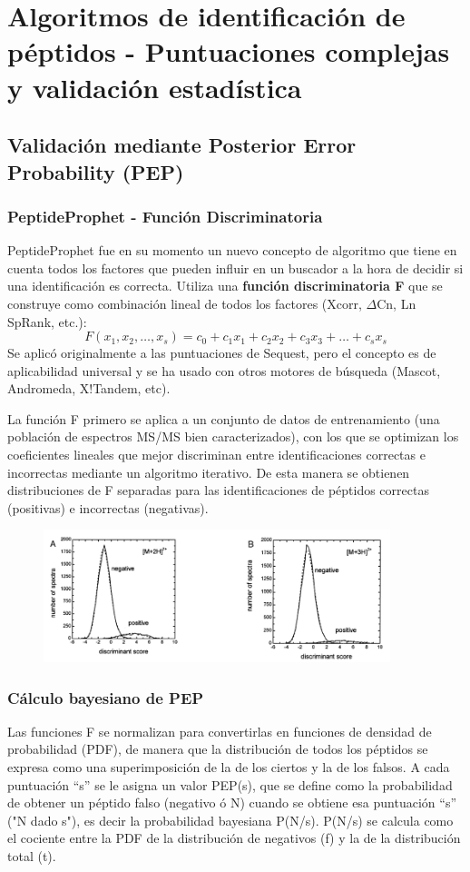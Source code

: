 \section{Algoritmos de identificación de péptidos - Puntuaciones complejas y validación estadística}
\subsection{Validación mediante Posterior Error Probability (PEP)}
\subsubsection{PeptideProphet - Función Discriminatoria}
PeptideProphet fue en su momento un nuevo concepto de algoritmo que tiene en cuenta todos los factores que pueden influir en un buscador a la hora de decidir si una identificación es correcta. Utiliza una \textbf{función discriminatoria F} que se construye como combinación lineal de todos los factores (Xcorr, $\Delta$Cn, Ln SpRank, etc.):
$$F(x_1, x_2, \ldots, x_s) = c_0 + c_1x_1 + c_2x_2 + c_3x_3 + \ldots + c_sx_s$$
Se aplicó originalmente a las puntuaciones de Sequest, pero el concepto es de aplicabilidad universal y se ha usado con otros motores de búsqueda (Mascot, Andromeda, X!Tandem, etc). 

La función F primero se aplica a un conjunto de datos de entrenamiento (una población de espectros MS/MS bien caracterizados), con los que se optimizan los coeficientes lineales que mejor discriminan entre identificaciones correctas e incorrectas mediante un algoritmo iterativo. De esta manera se obtienen distribuciones de F separadas para las identificaciones de péptidos correctas (positivas) e incorrectas (negativas).

\begin{figure}[h]
\centering
\includegraphics[width = 0.9\textwidth]{figs/peptideprophet.png}
\end{figure}

\subsubsection{Cálculo bayesiano de PEP}
Las funciones F se normalizan para convertirlas en funciones de densidad de probabilidad (PDF), de manera que la distribución de todos los péptidos se expresa como una superimposición de la de los ciertos y la de los falsos. A cada puntuación “s” se le asigna un valor PEP(s), que se define como la probabilidad de obtener un péptido falso (negativo ó N) cuando se obtiene esa puntuación “s” ("N dado s"), es decir la probabilidad bayesiana P(N/s). P(N/s) se calcula como el cociente entre la PDF de la distribución de negativos (f) y la de la distribución total (t).

